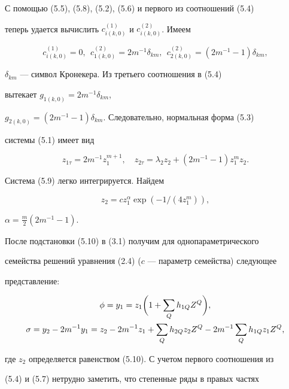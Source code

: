 С помощью (5.5), (5.8), (5.2), (5.6) и первого из соотношений (5.4) 


теперь удается вычислить $c^{(1)}_{i(k,0)}$ и $c^{(2)}_{i(k,0)}$. Имеем 


$$ 


c^{(1)}_{i(k,0)}=0,\ \ c^{(2)}_{1(k,0)}=2m^{-1}\delta_{km},\ \ 


c^{(2)}_{2(k,0)}=(2m^{-1}-1)\delta_{km}, 


$$ 


$\delta_{km}$ --- символ Кронекера. Из третьего соотношения в (5.4) 


вытекает $g_{1(k,0)}=2m^{-1}\delta_{km}$, 


$g_{2(k,0)}=(2m^{-1}-1)\delta_{km}$. Следовательно, нормальная форма (5.3) 


системы (5.1) имеет вид 


\begin{equation} 


z_{1\tau}=2m^{-1}z^{m+1}_1,\quad 


z_{2\tau}=\lambda_2z_2+(2m^{-1}-1)z^m_1z_2. 


\end{equation} 


Система (5.9) легко интегрируется. Найдем 


\begin{equation} 


z_2=c z^\alpha_1\exp(-1/(4z^m_1)), 


\end{equation} 


$\alpha=\frac{m}{2}(2m^{-1}-1)$.


После подстановки (5.10) в (3.1) получим для однопараметрического 


семейства решений уравнения (2.4) ($c$ --- параметр семейства) следующее 


представление: 


\begin{gather} 


\phi=y_1=z_1\bigg(1+\sum_Q h_{1Q}Z^Q\bigg),\\ 


\sigma=y_2-2m^{-1}y_1=z_2-2m^{-1}z_1+\sum_Q h_{2Q}z_2Z^Q- 


2m^{-1}\sum_Q h_{1Q}z_1Z^Q,\notag 


\end{gather} 


где $z_2$ определяется равенством (5.10). С учетом первого соотношения из 


(5.4) и (5.7) нетрудно заметить, что степенные ряды в правых частях 


